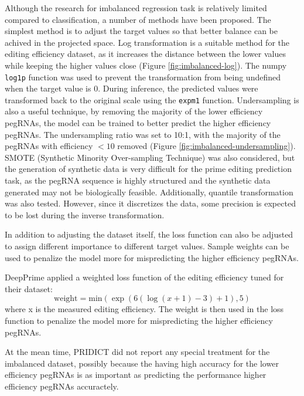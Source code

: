 Although the research for imbalanced regression task is relatively limited compared to classification, a number of methods have been proposed\cite{krawczykLearningImbalancedData2016}. The simplest method is to adjust the target values so that better balance can be achived in the projected space. Log transformation is a suitable method for the editing efficiency dataset, as it increases the distance between the lower values while keeping the higher values close (Figure \ref{fig:imbalanced-log}). The numpy \verb|log1p| function was used to prevent the transformation from being undefined when the target value is 0. During inference, the predicted values were transformed back to the original scale using the \verb|expm1| function. Undersampling is also a useful technique, by removing the majority of the lower efficiency pegRNAs, the model can be trained to better predict the higher efficiency pegRNAs. The undersampling ratio was set to 10:1, with the majority of the pegRNAs with efficiency $<10$ removed (Figure \ref{fig:imbalanced-undersampling})\cite{torgoResamplingStrategiesRegression2015}. SMOTE (Synthetic Minority Over-sampling Technique) was also considered, but the generation of synthetic data is very difficult for the prime editing prediction task, as the pegRNA sequence is highly structured and the synthetic data generated may not be biologically feasible. Additionally, quantile transformation was also tested. However, since it discretizes the data, some precision is expected to be lost during the inverse transformation.

In addition to adjusting the dataset itself, the loss function can also be adjusted to assign different importance to different target values. Sample weights can be used to penalize the model more for mispredicting the higher efficiency pegRNAs. 


DeepPrime applied a weighted loss function of the editing efficiency tuned for their dataset:
\begin{equation}
    \text{weight} = \text{min}(\exp(6(\log(x+1)-3)+1),5)
\end{equation}
where x is the measured editing efficiency. The weight is then used in the loss function to penalize the model more for mispredicting the higher efficiency pegRNAs.

At the mean time, PRIDICT did not report any special treatment for the imbalanced dataset, possibly because the having high accuracy for the lower efficiency pegRNAs is as important as predicting the performance higher efficiency pegRNAs accuractely. 

